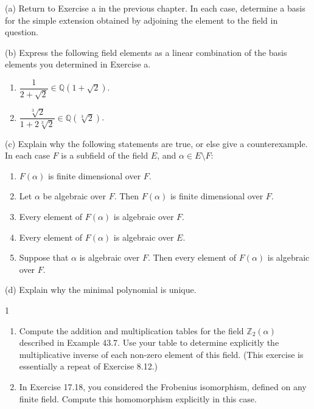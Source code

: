 \begin{problem}[Warmup]{(a)}
    Return to Exercise a in the previous chapter. In each case, determine a basis for the simple extension obtained by adjoining the element to the field in question.
\end{problem}
\unsolved

\begin{problem}[Warmup]{(b)}
    Express the following field elements as a linear combination of the basis elements you determined in Exercise a.
    \begin{enumerate}
        \item[(a)] $\dfrac{1}{2 + \sqrt{2}} \in \mathbb{Q}(1 + \sqrt{2})$.
        \item[(b)] $\dfrac{\sqrt[3]{2}}{1 + 2\sqrt[3]{2}} \in \mathbb{Q}(\sqrt[3]{2})$.
    \end{enumerate}
\end{problem}
\unsolved

\begin{problem}[Warmup]{(c)}
    Explain why the following statements are true, or else give a counterexample. In each case $F$ is a subfield of the field $E$, and $\alpha \in E \setminus F$:
    \begin{enumerate}
        \item[(a)] $F(\alpha)$ is finite dimensional over $F$.
        \item[(b)] Let $\alpha$ be algebraic over $F$. Then $F(\alpha)$ is finite dimensional over $F$.
        \item[(c)] Every element of $F(\alpha)$ is algebraic over $F$.
        \item[(d)] Every element of $F(\alpha)$ is algebraic over $E$.
        \item[(e)] Suppose that $\alpha$ is algebraic over $F$. Then every element of $F(\alpha)$ is algebraic over $F$.
    \end{enumerate}
\end{problem}
\unsolved

\begin{problem}[Warmup]{(d)}
    Explain why the minimal polynomial is unique.
\end{problem}
\unsolved

\begin{problem}{1}
    \begin{enumerate}
        \item[(a)] Compute the addition and multiplication tables for the field
        $\mathbb{Z}_2(\alpha)$ described in Example 43.7. Use your table to determine
        explicitly the multiplicative inverse of each non-zero element of this field. (This
        exercise is essentially a repeat of Exercise 8.12.)
        \item[(b)] In Exercise 17.18, you considered the Frobenius isomorphism, defined on
        any finite field. Compute this homomorphism explicitly in this case.
    \end{enumerate}
\end{problem}
\unsolved

